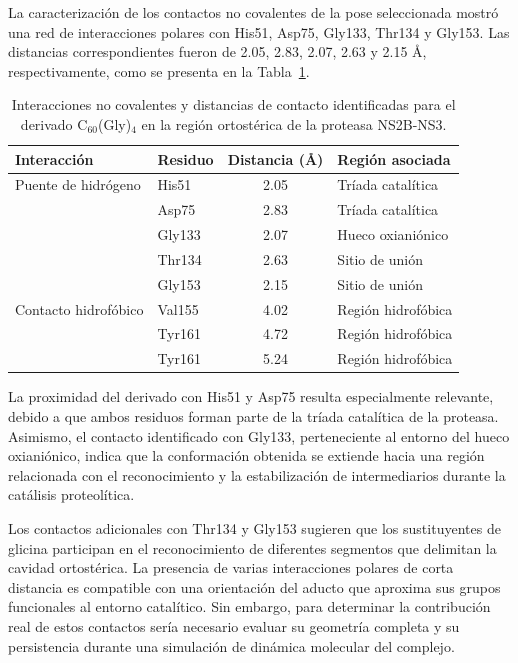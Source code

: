 La caracterización de los contactos no covalentes de la pose seleccionada mostró una red de interacciones polares con His51, Asp75, Gly133, Thr134 y Gly153. Las distancias correspondientes fueron de 2.05, 2.83, 2.07, 2.63 y 2.15 \AA, respectivamente, como se presenta en la Tabla~\ref{tab:interacciones-pose1}.

\begin{table}[H]
    \centering
    \caption{Interacciones no covalentes y distancias de contacto identificadas para el derivado C$_{60}$(Gly)$_4$ en la región ortostérica de la proteasa NS2B-NS3.}
    \label{tab:interacciones-pose1}
    \footnotesize
    \renewcommand{\arraystretch}{1.15}
    \begin{tabular}{llcl}
        \toprule
        Interacción & Residuo & Distancia (\AA) & Región asociada \\
        \midrule
        Puente de hidrógeno & His51  & 2.05 & Tríada catalítica \\
                            & Asp75  & 2.83 & Tríada catalítica \\
                            & Gly133 & 2.07 & Hueco oxianiónico \\
                            & Thr134 & 2.63 & Sitio de unión \\
                            & Gly153 & 2.15 & Sitio de unión \\
        \midrule
        Contacto hidrofóbico & Val155 & 4.02 & Región hidrofóbica \\
                            & Tyr161 & 4.72 & Región hidrofóbica \\
                            & Tyr161 & 5.24 & Región hidrofóbica \\
        \bottomrule
    \end{tabular}
\end{table}

La proximidad del derivado con His51 y Asp75 resulta especialmente relevante, debido a que ambos residuos forman parte de la tríada catalítica de la proteasa. Asimismo, el contacto identificado con Gly133, perteneciente al entorno del hueco oxianiónico, indica que la conformación obtenida se extiende hacia una región relacionada con el reconocimiento y la estabilización de intermediarios durante la catálisis proteolítica.

Los contactos adicionales con Thr134 y Gly153 sugieren que los sustituyentes de glicina participan en el reconocimiento de diferentes segmentos que delimitan la cavidad ortostérica. La presencia de varias interacciones polares de corta distancia es compatible con una orientación del aducto que aproxima sus grupos funcionales al entorno catalítico. Sin embargo, para determinar la contribución real de estos contactos sería necesario evaluar su geometría completa y su persistencia durante una simulación de dinámica molecular del complejo.

